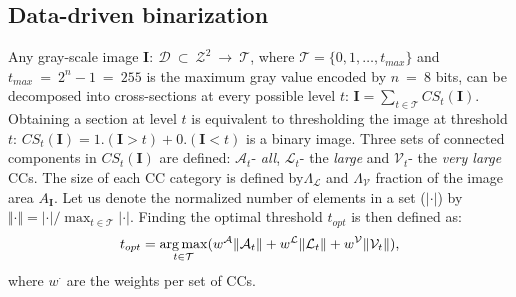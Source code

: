 \documentclass{article}
\def\I{{\mathbf I}}
\def\mcT{{\mathcal{T}}}
\def\mcD{{\mathcal{D}}}
\def\mcA{{\mathcal{A}}}
\def\mcL{{\mathcal{L}}}
\def\mcV{{\mathcal{V}}}
\DeclareMathOperator*{\argmax}{arg\,max}
\begin{document}
\subsection{Data-driven binarization}
\label{ssec:binarize}
Any gray-scale image  $\I:~\mcD~\subset~\mathcal{Z}^2~\rightarrow ~\mcT $, where $\mcT=\{0,1,\ldots, t_{max}\}$ and $t_{max}~=~2^n-1~=~255$ is the maximum gray value encoded by $n~=~8$ bits, can be decomposed into cross-sections at
every possible level $t$:  $\I = \sum_{t \in \mcT}CS_t(\I)$. Obtaining a section at level $t$ is equivalent to thresholding the image at threshold $t$: $CS_t(\I)= 1.(\I>t) + 0.(\I<t)$ is a binary image. 
Three sets of connected components in $CS_t(\I)$ are defined: $\mcA_t$- {\em all}, $\mcL_t$- the {\em large} and $\mcV_t$- the {\em very large} CCs.  The size of each CC category is defined by$\Lambda_{\mcL}$ and $\Lambda_{\mcV}$ fraction of the image area $A_{\I}$. Let us denote the normalized number of elements in a set ($|\cdot|$) by $\Vert \cdot \Vert = |\cdot| / \max_{t \in \mcT}|\cdot|$.
Finding the optimal threshold $t_{opt}$ is then defined as:
\begin{equation*}
\vspace{-0.05cm}
t_{opt} = \argmax_{t \in \mcT}( w^{\mcA} \Vert \mcA_t \Vert + w^{\mcL} \Vert \mcL_t \Vert + w^{\mcV} \Vert \mcV_t \Vert ),
\vspace{-0.05cm}
\end{equation*}
where $w^{\cdot}$ are the weights per set of CCs.  
\end{document}
